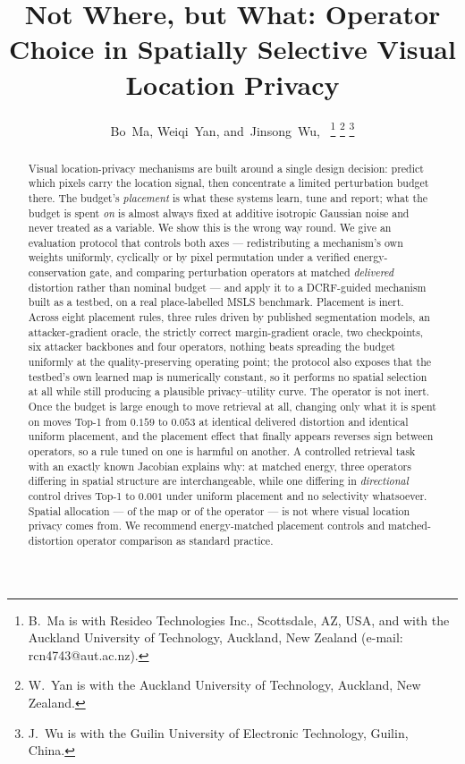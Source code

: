 \documentclass[10pt,journal]{IEEEtran}
\title{Not Where, but What: Operator Choice in Spatially Selective Visual Location Privacy}
\author{Bo~Ma,
        Weiqi~Yan,
        and~Jinsong~Wu,~\IEEEmembership{Senior~Member,~IEEE}
\thanks{B.~Ma is with Resideo Technologies Inc., Scottsdale, AZ, USA, and with
the Auckland University of Technology, Auckland, New Zealand (e-mail:
rcn4743@aut.ac.nz).}
\thanks{W.~Yan is with the Auckland University of Technology, Auckland, New
Zealand.}
\thanks{J.~Wu is with the Guilin University of Electronic Technology, Guilin,
China.}}
\begin{document}
\maketitle
\begin{abstract}
Visual location-privacy mechanisms are built around a single design decision: predict which pixels carry the location signal, then concentrate a limited perturbation budget there. The budget's \emph{placement} is what these systems learn, tune and report; what the budget is spent \emph{on} is almost always fixed at additive isotropic Gaussian noise and never treated as a variable. We show this is the wrong way round. We give an evaluation protocol that controls both axes --- redistributing a mechanism's own weights uniformly, cyclically or by pixel permutation under a verified energy-conservation gate, and comparing perturbation operators at matched \emph{delivered} distortion rather than nominal budget --- and apply it to a DCRF-guided mechanism built as a testbed, on a real place-labelled MSLS benchmark. Placement is inert. Across eight placement rules, three rules driven by published segmentation models, an attacker-gradient oracle, the strictly correct margin-gradient oracle, two checkpoints, six attacker backbones and four operators, nothing beats spreading the budget uniformly at the quality-preserving operating point; the protocol also exposes that the testbed's own learned map is numerically constant, so it performs no spatial selection at all while still producing a plausible privacy--utility curve. The operator is not inert. Once the budget is large enough to move retrieval at all, changing only what it is spent on moves Top-1 from $0.159$ to $0.053$ at identical delivered distortion and identical uniform placement, and the placement effect that finally appears reverses sign between operators, so a rule tuned on one is harmful on another. A controlled retrieval task with an exactly known Jacobian explains why: at matched energy, three operators differing in spatial structure are interchangeable, while one differing in \emph{directional} control drives Top-1 to $0.001$ under uniform placement and no selectivity whatsoever. Spatial allocation --- of the map or of the operator --- is not where visual location privacy comes from. We recommend energy-matched placement controls and matched-distortion operator comparison as standard practice.
\end{abstract}
\end{document}
